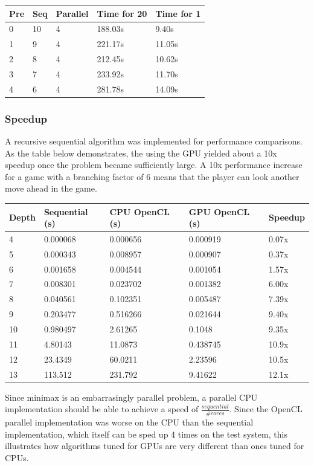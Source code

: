 \documentclass{article}
\begin{document}
\begin{tabular}{| l | l | l | l | l |}
  \hline
  Pre & Seq & Parallel & Time for 20 & Time for 1 \\
  \hline
  0 & 10 & 4 & 188.03s & 9.40s \\
  1 & 9 & 4 & 221.17s & 11.05s \\ 
  2 & 8 & 4 & 212.45s & 10.62s \\
  3 & 7 & 4 & 233.92s & 11.70s \\ 
  4 & 6 & 4 & 281.78s & 14.09s \\
  \hline
\end{tabular}

\subsubsection{Speedup}
A recursive sequential algorithm was implemented for performance comparisons. As the table below demonstrates, the using the GPU yielded about a 10x speedup once the problem became sufficiently large. A 10x performance increase for a game with a branching factor of 6 means that the player can look another move ahead in the game.

\begin{tabular}{| l | l | l | l | l |}
  \hline
  Depth & Sequential (s) & CPU OpenCL (s) & GPU OpenCL (s) & Speedup\\
  \hline
  4 & 0.000068 & 0.000656 & 0.000919 & 0.07x \\
  5 & 0.000343 & 0.008957 & 0.000907 & 0.37x \\
  6 & 0.001658 & 0.004544 & 0.001054 & 1.57x \\
  7 & 0.008301 & 0.023702 & 0.001382 & 6.00x \\
  8 & 0.040561 & 0.102351 & 0.005487 & 7.39x \\
  9 & 0.203477 & 0.516266 & 0.021644 & 9.40x \\
  10 & 0.980497 & 2.61265 & 0.1048 & 9.35x \\
  11 & 4.80143 & 11.0873 & 0.438745 & 10.9x \\
  12 & 23.4349 & 60.0211 & 2.23596 & 10.5x \\
  13 & 113.512 & 231.792 & 9.41622 & 12.1x \\
  \hline
\end{tabular}
Since minimax is an embarrasingly parallel problem, a parallel CPU implementation should be able to achieve a speed of $\frac{sequential}{\# cores}$. Since the OpenCL parallel implementation was worse on the CPU than the sequential implementation, which itself can be sped up 4 times on the test system, this illustrates how algorithms tuned for GPUs are very different than ones tuned for CPUs.
\end{document}
